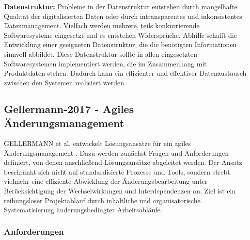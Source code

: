 \textbf{Datenstruktur: }
Probleme in der Datenstruktur entstehen durch mangelhafte Qualität der digitalisierten Daten oder durch intransparentes und inkonsistentes Datenmanagement. Vielfach werden mehrere, teils konkurrierende Softwaresysteme eingesetzt und es entstehen Widersprüche. 
Abhilfe schafft die Entwicklung einer geeigneten Datenstruktur, die die benötigten Informationen sinnvoll abbildet. Diese Datenstruktur sollte in allen eingesetzten Softwaresystemen implementiert werden, die im Zusammenhang mit Produktdaten stehen. Dadurch kann ein effizienter und effektiver Datenaustausch zwischen den Systemen realisiert werden.  

\subsection*{Gellermann-2017 - Agiles Änderungsmanagement}

GELLERMANN et al. entwickelt Lösungsansätze für ein agiles Änderungsmanagement \cite{Gellermann2017}. Dazu werden zunächst Fragen und Anforderungen definiert, von denen anschließend Lösungsansätze abgeleitet werden. Der Ansatz beschränkt sich nicht auf standardisierte Prozesse und Tools, sondern strebt vielmehr eine effiziente Abwicklung der Änderungsbearbeitung unter Berücksichtigung der Wechselwirkungen und Interdependenzen an.  Ziel ist ein reibungsloser Projektablauf durch inhaltliche und organisatorische Systematisierung änderungsbedingter Arbeitsabläufe. 

\subsubsection*{Anforderungen}

